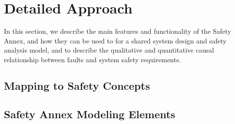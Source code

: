 \section{Detailed Approach}
\label{sec:detailed_approach}

In this section, we describe the main features and functionality of the Safety Annex, and how they can be used to for a shared system design and safety analysis model, and to describe the qualitative and quantitative causal relationship between faults and system safety requirements.

\subsection{Mapping to Safety Concepts}

\subsection{Safety Annex Modeling Elements}

